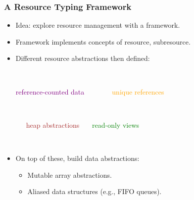 \documentclass[10pt]{beamer}
\begin{document}
\begin{frame}
\frametitle{A Resource Typing Framework}
\begin{itemize}
\item Idea: explore resource management with a framework.
\item Framework implements concepts of resource, subresource.
\item Different resource abstractions then defined:

\ 

\textcolor{purple}{reference-counted data}\ \ \ \ \ \ \ \ \textcolor{orange}{unique references}


\ 

\ \ \ \textcolor{brown}{heap abstractions} \ \ \ \textcolor{green}{read-only views}

\ 

\item On top of these, build data abstractions:

\begin{itemize}
\item Mutable array abstractions.
\item Aliased data structures (e.g., FIFO queues). 
\end{itemize}

\end{itemize}
\end{frame}
\end{document}
